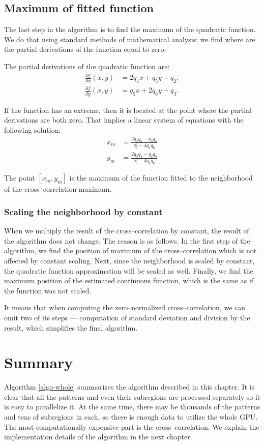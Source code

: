 \subsection{Maximum of fitted function}
\label{max-fitted}
The last step in the algorithm is to find the maximum of the quadratic function. We do that using standard methods of mathematical analysis: we find where are the partial derivations of the function equal to zero.

The partial derivations of the quadratic function are:
\begin{align*}
\frac{\partial f}{\partial x}(x,y) &= 2q_4x + q_5y + q_2,\\
\frac{\partial f}{\partial y}(x,y) &= q_5x + 2q_6y + q_3.
\end{align*}

If the function has an extreme, then it is located at the point where the partial derivations are both zero. That implies a linear system of equations with the following solution:
\begin{align*}
x_m &= \frac{2q_2q_6 - q_3q_5}{q_5^2 - 4q_4q_6}\\
y_m &= \frac{2q_3q_4 - q_2q_5}{q_5^2 - 4q_4q_6}
\end{align*}

The point $[x_m, y_m]$ is the maximum of the function fitted to the neighborhood of the cross--correlation maximum.

\subsubsection{Scaling the neighborhood by constant}

When we multiply the result of the cross--correlation by constant, the result of the algorithm does not change. The reason is as follows. In the first step of the algorithm, we find the position of maximum of the cross--correlation which is not affected by constant scaling. Next, since the neighborhood is scaled by constant, the quadratic function approximation will be scaled as well. Finally, we find the maximum position of the estimated continuous function, which is the same as if the function was not scaled.

It means that when computing the zero--normalized cross--correlation, we can omit two of its steps --- computation of standard deviation and division by the result, which simplifies the final algorithm.

\section{Summary}
\label{algo-summary}
Algorithm \ref{algo-whole} summarizes the algorithm described in this chapter. It is clear that all the patterns and even their subregions are processed separately so it is easy to parallelize it. At the same time, there may be thousands of the patterns and tens of subregions in each, so there is enough data to utilize the whole GPU. The most computationally expensive part is the cross--correlation. We explain the implementation details of the algorithm in the next chapter.

